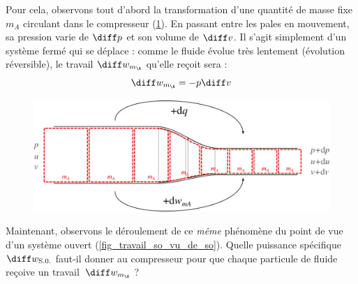 		Pour cela, observons tout d’abord la transformation d’une quantité de masse fixe $m_A$ circulant dans le compresseur (\cref{fig_travail_so_vu_de_sf}). En passant entre les pales en mouvement, sa pression varie de $\diff p$ et son volume de $\diff v$. Il s’agit simplement d’un système fermé qui se déplace : comme le fluide évolue très lentement (évolution réversible), le travail $\diff w_{m_\A}$ qu’elle reçoit sera :
		\begin{equation}
			\diff w_{m_\A} = -p \diff v
		\end{equation}

		\begin{figure}
			\begin{center}
				\includegraphics[width=\textwidth]{images/travail_sf_so1.png}
			\end{center}
			\label{fig_travail_so_vu_de_sf}
		\end{figure}

		Maintenant, observons le déroulement de ce \emph{même} phénomène du point de vue d’un système ouvert (\cref{fig_travail_so_vu_de_so}). Quelle puissance spécifique $\diff w_\text{S.0.}$ faut-il donner au compresseur pour que chaque particule de fluide reçoive un travail~$\diff w_{m_\A}$ ?

